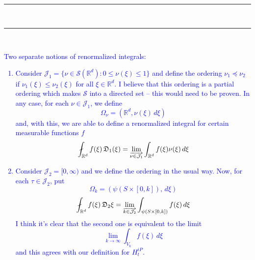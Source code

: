 \documentclass[11pt]{article}
\newcommand{\al}{\alpha}
\newcommand{\slantedslash}{\mathbin{\rotatebox[origin=c]{23}{$-$}}}
\newcommand{\rint}{\mathop{\mathpalette\docircint\relax}\!\int}
\newcommand{\docircint}[2]{%
  \ifx#1\displaystyle
    \displayrint
  \else
    \normalrint{#1}%
  \fi
}
\newcommand{\displayrint}{\displaystyle \slantedslash \mkern-18mu}
\newcommand{\normalrint}[1]{%
  \smallerc{#1}\ifx#1\textstyle\mkern-9mu\else\mkern-8.2mu\fi
}
\newcommand{\smallerc}[1]{%
  \vcenter{\hbox{$\ifx#1\textstyle\scriptstyle\else\scriptscriptstyle\fi \slantedslash $}}%
}
\begin{document}







\hrule
$\,$
\hrule
$\,$\\
\textcolor{blue}{
Two separate notions of renormalized integrals:
\begin{enumerate}
    \item Consider $\mathcal{J}_1=\{\nu\in \mathcal{S}(\mathbb{R}^d):0\leq\nu(\xi)\leq 1\}$ and define the ordering $\nu_1 \preccurlyeq \nu_2$ if $\nu_1(\xi)\leq \nu_2(\xi)$ for all $\xi\in\mathbb{R}^d$. I believe that this ordering is a partial ordering which makes $\mathcal{S}$ into a directed set -- this would need to be proven. In any case, for each $\nu\in \mathcal{J}_1$, we define
    \begin{equation*}
        \Omega_\nu= (\mathbb{R}^d,\nu(\xi)\,d\xi)
    \end{equation*}
    and, with this, we are able to define a renormalized integral for certain measurable functions $f$
    \begin{equation*}
        \rint_{\mathbb{R}^d} f(\xi)\,\mathfrak{D}_1(\xi)
        =
        \lim_{{\overrightarrow{\nu\in \mathcal{J}_1}}}
        \int_{\mathbb{R}^d} f(\xi)\nu(\xi)\,d\xi
    \end{equation*}
    \item Consider $\mathcal{J}_2=[0,\infty)$ and we define the ordering in the usual way.  Now, for each $\tau\in\mathcal{J}_2$, put
    \begin{equation*}
        \Omega_k=(\psi(S\times [0,k]),\,d\xi)
    \end{equation*}
    \begin{equation*}
        \rint_{\mathbb{R}^d} f(\xi)\,\mathfrak{D}_2\xi
        =
        \lim_{{\overrightarrow{k\in \mathcal{J}_2}}}\int_{\psi(S\times [0,k])}f(\xi)\,d\xi
    \end{equation*}
    I think it's clear that the second one is equivalent to the limit
    \begin{equation*}
        \lim_{k\to\infty}\int_{V_k}f(\xi)\,d\xi
    \end{equation*}
    and this agrees with our definition for $H_t^{iP}$.
\end{enumerate}
}
\end{document}
